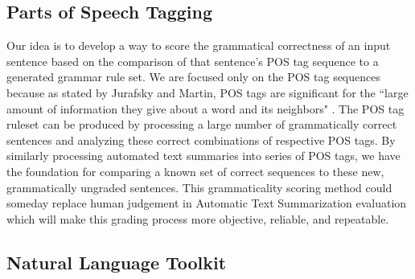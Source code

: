 \documentclass[11pt,a4paper]{article}
\begin{document}
\begin{multicols}{2}
\section{Parts of Speech Tagging}
Our idea is to develop a way to score the grammatical correctness of an input sentence based on the comparison of that sentence's POS tag sequence to a generated grammar rule set. We are focused only on the POS tag sequences because as stated by Jurafsky and Martin, POS tags are significant for the ``large amount of information they give about a word and its neighbors" \cite{jurafsky}. The POS tag ruleset can be produced by processing a large number of grammatically correct sentences and analyzing these correct combinations of respective POS tags. By similarly processing automated text summaries into series of POS tags, we have the foundation for comparing a known set of correct sequences to these new, grammatically ungraded sentences. This grammaticality scoring method could someday replace human judgement in Automatic Text Summarization evaluation which will make this grading process more objective, reliable, and repeatable.


\subsection{Natural Language Toolkit}


\end{multicols}
\end{document}
